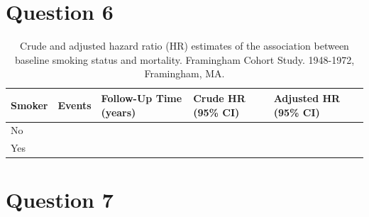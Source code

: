 \documentclass{article}\usepackage[]{graphicx}\usepackage[]{color}
\newif\ifdraft  %
\begin{document}
\ifdraft

Write the equation for the log-hazard function for the \textit{adjusted} model you estimated. \textbf{Clearly define all functions, terms (covariates), and parameters in the model. (20 points)}

\fi

\pagebreak

\section*{Question 6}

\ifdraft

Complete the following table. How would you interpret the parameter estimate that compares smokers to non-smokers in the \textbf{adjusted model}? What measure of association common in epidemiologic research does this correspond to? \textbf{(10 points)}

\fi





\begin{table}[H]
\centering
\parbox{10cm}{\caption{Crude and adjusted hazard ratio (HR) estimates of the association between baseline smoking status and mortality. Framingham Cohort Study. 1948-1972, Framingham, MA.}} 
\begin{tabular}{lllll}
  \hline
Smoker & Events & Follow-Up Time (years) & Crude HR (95\% CI) & Adjusted HR (95\% CI) \\ 
  \hline
No &  &  &  &  \\ 
  Yes &  &  &  &  \\ 
   \hline
\end{tabular}
\end{table}

  
\pagebreak

\section*{Question 7}

\ifdraft

Based on the model that included covariate-by-time interactions, is there evidence for a violation of the proportional hazards assumption in any of the variables? Indicate how you arrived at your conclusion. \ul{In 1-2 sentences} describe in general how you would account for any violations in the proportional hazards assumption (ignoring whether or not there were significant differences here). \textbf{(10 points)}

\fi
\end{document}
